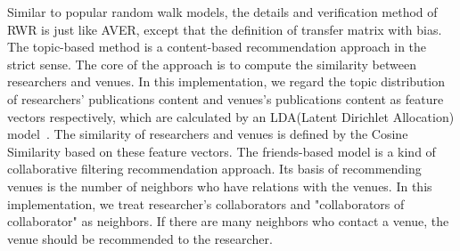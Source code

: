 \documentclass[9pt]{acm_proc_article-sp}
\begin{document}
Similar to popular random walk models, the details and verification method of RWR is just like AVER, except that the definition of transfer matrix with bias. The topic-based method is a content-based recommendation approach in the strict sense. The core of the approach is to compute the similarity between researchers and venues. In this implementation, we regard the topic distribution of researchers' publications content and venues's publications content as feature vectors respectively, which are calculated by an LDA(Latent Dirichlet Allocation) model~\cite{blei2003latent}. The similarity of researchers and venues is defined by the Cosine Similarity based on these feature vectors. The friends-based model is a kind of collaborative filtering recommendation approach. Its basis of recommending venues is the number of neighbors who have relations with the venues. In this implementation, we treat researcher's collaborators and "collaborators of collaborator" as neighbors. If there are many neighbors who contact a venue, the venue should be recommended to the researcher.
\end{document}
